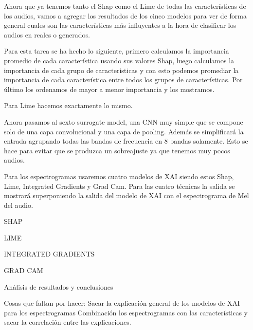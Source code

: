 Ahora que ya tenemos tanto el Shap como el Lime de todas las características de los audios, vamos a agregar los resultados de los cinco modelos para ver de forma general cuales son las características más influyentes a la hora de clasificar los audios en reales o generados.

Para esta tarea se ha hecho lo siguiente, primero calculamos la importancia promedio de cada característica usando sus valores Shap, luego calculamos la importancia de cada grupo de características y con esto podemos promediar la importancia de cada característica entre todos los grupos de características. Por último los ordenamos de mayor a menor importancia y los mostramos.


Para Lime hacemos exactamente lo mismo.


Ahora pasamos al sexto surrogate model, una CNN muy simple que se compone solo de una capa convolucional y una capa de pooling. Además se simplificará la entrada agrupando todas las bandas de frecuencia en 8 bandas solamente. Esto se hace para evitar que se produzca un sobreajuste ya que tenemos muy pocos audios.

Para los espectrogramas usaremos cuatro modelos de XAI siendo estos Shap, Lime, Integrated Gradients y Grad Cam. Para las cuatro técnicas la salida se mostrará superponiendo la salida del modelo de XAI con el espectrograma de Mel del audio.

SHAP

LIME

INTEGRATED GRADIENTS

GRAD CAM

Análisis de resultados y conclusiones

Cosas que faltan por hacer:
Sacar la explicación general de los modelos de XAI para los espectrogramas 
Combinación los espectrogramas con las características y sacar la correlación entre las explicaciones.
